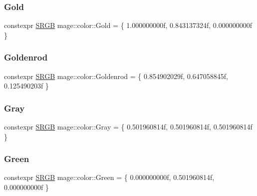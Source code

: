 \hypertarget{namespacemage_1_1color_a08ff3cba6a508f8891b7a7e4f9bd4130}{}\label{namespacemage_1_1color_a08ff3cba6a508f8891b7a7e4f9bd4130} 
\subsubsection{\texorpdfstring{Gold}{Gold}}
{\footnotesize\ttfamily constexpr \hyperlink{structmage_1_1_s_r_g_b}{S\+R\+GB} mage\+::color\+::\+Gold = \{ 1.\+000000000f, 0.\+843137324f, 0.\+000000000f \}}

\hypertarget{namespacemage_1_1color_a77a2452973e57ec9276e3b3e3098d3f6}{}\label{namespacemage_1_1color_a77a2452973e57ec9276e3b3e3098d3f6} 
\subsubsection{\texorpdfstring{Goldenrod}{Goldenrod}}
{\footnotesize\ttfamily constexpr \hyperlink{structmage_1_1_s_r_g_b}{S\+R\+GB} mage\+::color\+::\+Goldenrod = \{ 0.\+854902029f, 0.\+647058845f, 0.\+125490203f \}}

\hypertarget{namespacemage_1_1color_acae935f90935efc4d36a585ec161968e}{}\label{namespacemage_1_1color_acae935f90935efc4d36a585ec161968e} 
\subsubsection{\texorpdfstring{Gray}{Gray}}
{\footnotesize\ttfamily constexpr \hyperlink{structmage_1_1_s_r_g_b}{S\+R\+GB} mage\+::color\+::\+Gray = \{ 0.\+501960814f, 0.\+501960814f, 0.\+501960814f \}}

\hypertarget{namespacemage_1_1color_a23cf53e0103434f767585df9dc75017a}{}\label{namespacemage_1_1color_a23cf53e0103434f767585df9dc75017a} 
\subsubsection{\texorpdfstring{Green}{Green}}
{\footnotesize\ttfamily constexpr \hyperlink{structmage_1_1_s_r_g_b}{S\+R\+GB} mage\+::color\+::\+Green = \{ 0.\+000000000f, 0.\+501960814f, 0.\+000000000f \}}

